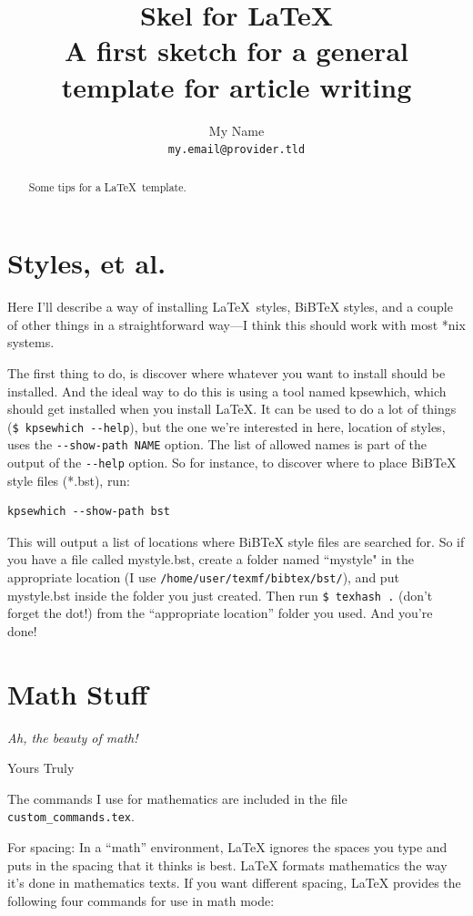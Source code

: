 \documentclass[a4paper,10pt,twocolumn]{article}
\title{\large\textbf{\huge Skel for \LaTeX}\\
A first sketch for a general template for article writing}
\author{My Name\\\texttt{my.email@provider.tld}}
\date{}
\begin{document}
\maketitle              %


\begin{abstract}
  Some tips for a \LaTeX\ template.
\end{abstract}

\section{Styles, et al.}
  Here I'll describe a way of installing \LaTeX\ styles, BiBTeX styles, and a couple 
  of other things in a straightforward way---I think this should work with most 
  *nix systems.

  The first thing to do, is discover where whatever you want to install should 
  be installed. And the ideal way to do this is using a tool named kpsewhich, 
  which should get installed when you install LaTeX. It can be used to do a lot 
  of things (\verb+$ kpsewhich --help+), but the one we’re interested in here, 
  location of styles, uses the \verb+--show-path NAME+ option. The list of 
  allowed names is part of the output of the \verb+--help+ option. So for 
  instance, to discover where to place BiBTeX style files (*.bst), run:
  \begin{verbatim}
kpsewhich --show-path bst
  \end{verbatim}

  This will output a list of locations where BiBTeX style files are searched 
  for. So if you have a file called mystyle.bst, create a folder named 
  ``mystyle" in the appropriate location (I use 
  \verb+/home/user/texmf/bibtex/bst/+), and put mystyle.bst inside the folder 
  you just created. Then run \verb+$ texhash .+ (don’t forget the dot!) from the 
  ``appropriate location'' folder you used. And you're done!

\section{Math Stuff}
  \epigraph{\emph{Ah, the beauty of math!}}{Yours Truly}
  The commands I use for mathematics are included in the file 
  \texttt{custom\_commands.tex}.

  For spacing: In a ``math'' environment, LaTeX ignores the spaces you type and 
  puts in the spacing that it thinks is best. LaTeX formats mathematics the
  way it’s done in mathematics texts. If you want different spacing, LaTeX 
  provides the following four commands for use in math mode: 
\end{document}
